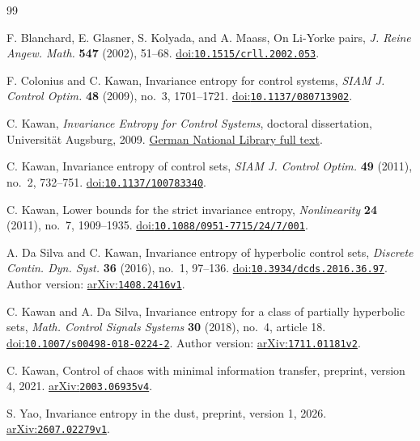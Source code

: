 \documentclass[11pt,a4paper]{article}
\theoremstyle{definition}
\theoremstyle{remark}
\begin{document}
\begin{thebibliography}{99}
\small\setlength{\itemsep}{4pt}

F. Blanchard, E. Glasner, S. Kolyada, and A. Maass,
On Li-Yorke pairs, \emph{J. Reine Angew. Math.} \textbf{547} (2002), 51--68.
\href{https://doi.org/10.1515/crll.2002.053}{doi:\nolinkurl{10.1515/crll.2002.053}}.

F. Colonius and C. Kawan,
Invariance entropy for control systems, \emph{SIAM J. Control Optim.} \textbf{48} (2009), no.~3, 1701--1721.
\href{https://doi.org/10.1137/080713902}{doi:\nolinkurl{10.1137/080713902}}.

C. Kawan, \emph{Invariance Entropy for Control Systems},
doctoral dissertation, Universit\"at Augsburg, 2009.
\href{https://d-nb.info/1000462749/34}{German National Library full text}.

C. Kawan, Invariance entropy of control sets,
\emph{SIAM J. Control Optim.} \textbf{49} (2011), no.~2, 732--751.
\href{https://doi.org/10.1137/100783340}{doi:\nolinkurl{10.1137/100783340}}.

C. Kawan, Lower bounds for the strict invariance entropy,
\emph{Nonlinearity} \textbf{24} (2011), no.~7, 1909--1935.
\href{https://doi.org/10.1088/0951-7715/24/7/001}{doi:\nolinkurl{10.1088/0951-7715/24/7/001}}.

A. Da Silva and C. Kawan, Invariance entropy of hyperbolic control sets,
\emph{Discrete Contin. Dyn. Syst.} \textbf{36} (2016), no.~1, 97--136.
\href{https://doi.org/10.3934/dcds.2016.36.97}{doi:\nolinkurl{10.3934/dcds.2016.36.97}}. Author version: \href{https://arxiv.org/abs/1408.2416v1}{arXiv:\nolinkurl{1408.2416v1}}.

C. Kawan and A. Da Silva, Invariance entropy for a class of partially hyperbolic sets,
\emph{Math. Control Signals Systems} \textbf{30} (2018), no.~4, article 18.
\href{https://doi.org/10.1007/s00498-018-0224-2}{doi:\nolinkurl{10.1007/s00498-018-0224-2}}. Author version: \href{https://arxiv.org/abs/1711.01181v2}{arXiv:\nolinkurl{1711.01181v2}}.

C. Kawan, Control of chaos with minimal information transfer,
preprint, version 4, 2021. \href{https://arxiv.org/abs/2003.06935v4}{arXiv:\nolinkurl{2003.06935v4}}.

S. Yao, Invariance entropy in the dust,
preprint, version 1, 2026. \href{https://arxiv.org/abs/2607.02279v1}{arXiv:\nolinkurl{2607.02279v1}}.


\end{thebibliography}
\end{document}
